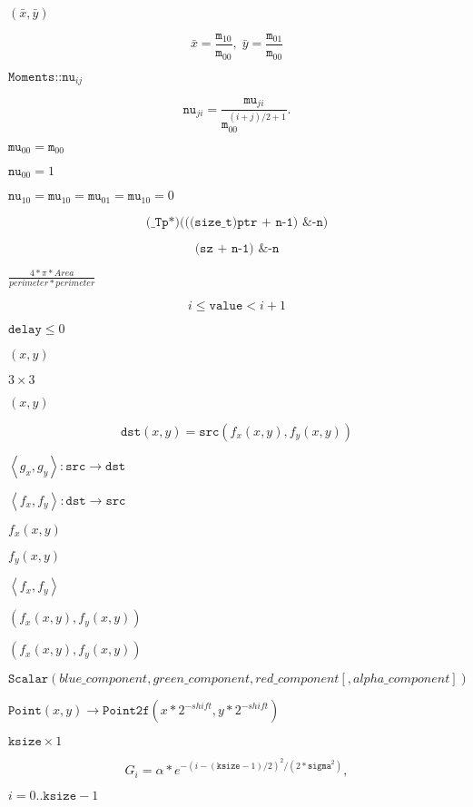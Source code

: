 \documentclass{article}
\begin{document}
$(\bar{x}, \bar{y})$
\pagebreak

\[\bar{x} = \frac{\texttt{m}_{10}}{\texttt{m}_{00}} , \; \bar{y} = \frac{\texttt{m}_{01}}{\texttt{m}_{00}}\]
\pagebreak

$\texttt{Moments::nu}_{ij}$
\pagebreak

\[\texttt{nu} _{ji}= \frac{\texttt{mu}_{ji}}{\texttt{m}_{00}^{(i+j)/2+1}} .\]
\pagebreak

$\texttt{mu}_{00}=\texttt{m}_{00}$
\pagebreak

$\texttt{nu}_{00}=1$
\pagebreak

$\texttt{nu}_{10}=\texttt{mu}_{10}=\texttt{mu}_{01}=\texttt{mu}_{10}=0$
\pagebreak

\[\texttt{(\_Tp*)(((size\_t)ptr + n-1) \& -n)}\]
\pagebreak

\[\texttt{(sz + n-1) \& -n}\]
\pagebreak

$\frac{4*\pi*Area}{perimeter * perimeter}$
\pagebreak

\[i \le \texttt{value} < i+1\]
\pagebreak

$\texttt{delay}\leq 0$
\pagebreak

$(x,y)$
\pagebreak

$3 \times 3$
\pagebreak

$(x, y)$
\pagebreak

\[\texttt{dst} (x,y)= \texttt{src} (f_x(x,y), f_y(x,y))\]
\pagebreak

$\left<g_x, g_y\right>: \texttt{src} \rightarrow
\texttt{dst}$
\pagebreak

$\left<f_x, f_y\right>: \texttt{dst} \rightarrow \texttt{src}$
\pagebreak

$f_x(x,y)$
\pagebreak

$f_y(x,y)$
\pagebreak

$\left<f_x, f_y\right>$
\pagebreak

$(f_x(x,y),
f_y(x,y))$
\pagebreak

$(f_x(x,y), f_y(x,y))$
\pagebreak

\[\texttt{Scalar} (blue \_ component, green \_ component, red \_ component[, alpha \_ component])\]
\pagebreak

$\texttt{Point}(x,y)\rightarrow\texttt{Point2f}(x*2^{-shift},y*2^{-shift})$
\pagebreak

$\texttt{ksize} \times 1$
\pagebreak

\[G_i= \alpha *e^{-(i-( \texttt{ksize} -1)/2)^2/(2* \texttt{sigma}^2)},\]
\pagebreak

$i=0..\texttt{ksize}-1$
\pagebreak
\end{document}
